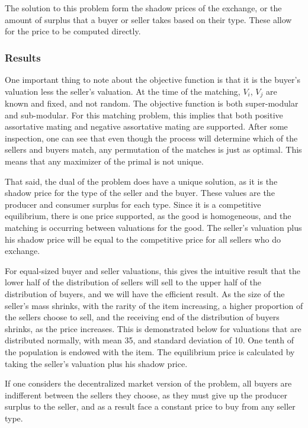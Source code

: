 \documentclass[12pt, letterpaper]{paper}
\begin{document}
The solution to this problem form the shadow prices of the exchange,
or the amount of surplus that a buyer or seller takes based on their
type. These allow for the price to be computed directly.

\subsubsection{Results}
\label{sec-2-1-1}
One important thing to note about the objective function is that it is
the buyer's valuation less the seller's valuation. At the time of the
matching, $V_i$, $V_j$ are known and fixed, and not random. The
objective function is both super-modular and sub-modular. For this
matching problem, this implies that both positive assortative mating
and negative assortative mating are supported. \cite{LitReview} After
some inspection, one can see that even though the process will
determine which of the sellers and buyers match, any permutation of
the matches is just as optimal. This means that any maximizer of the
primal is not unique.

That said, the dual of the problem does have a unique solution, as it is
the shadow price for the type of the seller and the buyer. These
values are the producer and consumer surplus for each type. Since it is
a competitive equilibrium, there is one price supported, as the good
is homogeneous, and the matching is occurring between valuations for the
good. The seller's valuation plus his shadow price will be equal to
the competitive price for all sellers who do exchange. 

For equal-sized buyer and seller valuations, this gives the intuitive
result that the lower half of the distribution of sellers will sell to
the upper half of the distribution of buyers, and we will have the
efficient result. As the size of the seller's mass shrinks, with the
rarity of the item increasing, a higher proportion of the sellers
choose to sell, and the receiving end of the distribution of buyers
shrinks, as the price increases. This is demonstrated below for
valuations that are distributed normally, with mean 35, and standard
deviation of 10. One tenth of the population is endowed with the item.
The equilibrium price is calculated by taking the seller's valuation
plus his shadow price.

If one considers the decentralized market version of the problem, all
buyers are indifferent between the sellers they choose, as they must
give up the producer surplus to the seller, and as a result face a
constant price to buy from any seller type. 
\end{document}
